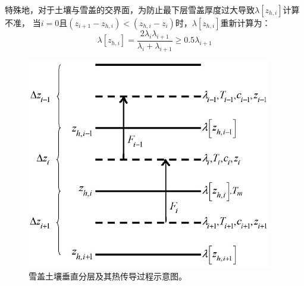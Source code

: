 特殊地，对于土壤与雪盖的交界面，为防止最下层雪盖厚度过大导致$\lambda\left[z_{h,i}\right]$计算不准，
当$i=0$且$\left(z_{i+1}-z_{h,i}\right)<\left(z_{h,i}-z_i\right)$时，$\lambda\left[z_{h,i}\right]$重新计算为：
\begin{equation}
\lambda\left[z_{h,i}\right]=\frac{2 \lambda_{i} \lambda_{i+1}}{\lambda_{i}+\lambda_{i+1}} \geq 0.5 \lambda_{i+1}
\end{equation}
{
\begin{figure}[htbp]
\centering
\includegraphics{Figures/雪盖土壤热力过程/雪盖土壤垂直分层及其热传导过程示意图.png}
\caption{雪盖土壤垂直分层及其热传导过程示意图。}
\label{fig:雪盖土壤垂直分层及其热传导过程示意图}
\end{figure}
}


